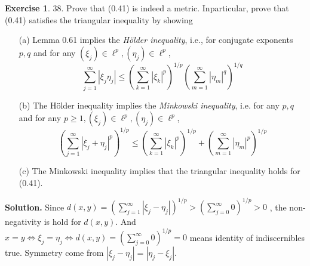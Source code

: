 \documentclass[a4paper]{book}
\newenvironment{solution}%
{\noindent\textbf{Solution.}}%
{\qedhere}
\numberwithin{equation}{chapter}
\theoremstyle{definition}
\newtheorem{exc}[exm]{Exercise}
\begin{document}
\begin{multicols}{2}
\begin{exc}
	38. Prove that (0.41) is indeed a metric. Inparticular, prove that (0.41) satisfies the triangular inequality by showing 
	\begin{itemize}
		\item [(a)] Lemma 0.61 implies the \textit{H\"{o}lder inequality}, i.e., for conjugate exponents $ p,q $ and for any $ (\xi_j) \in \ell^p, (\eta_j) \in \ell^p, $ 
		\begin{equation}\label{1:4:1}
			\sum_{j=1}^{\infty} |\xi_j \eta_j| \leq (\sum_{k=1}^{\infty}|\xi_k|^p)^{1/p} (\sum_{m=1}^{\infty}|\eta_m|^q)^{1/q} 
		\end{equation}
		
		\item[(b)] The H\"{o}lder inequality implies the \textit{Minkowski inequality}, i.e. for any $ p,q $ and for any $ p \geq 1, (\xi_j) \in \ell^p, (\eta_j) \in \ell^p $,
		\begin{equation}\label{1:4:2}
			(\sum_{j=1}^{\infty}|\xi_j + \eta_j|^p)^{1/p} \leq (\sum_{k=1}^{\infty}|\xi_k|^p)^{1/p} + (\sum_{m=1}^{\infty}|\eta_m|^p)^{1/p}
		\end{equation}
		
		\item[(c)] The Minkowski inequality implies that the triangular inequality holds for (0.41).
	\end{itemize}
\end{exc}

\begin{solution}
	Since $d(x,y) =(\sum_{j=1}^{\infty}|\xi_j - \eta_j|)^{1/p} > (\sum_{j = 0}^{\infty} 0)^{1/p} > 0 $ , the non-negativity is hold for $ d(x,y) $. And $ x = y \Longleftrightarrow \xi_j = \eta_j \Longleftrightarrow d(x,y) = (\sum_{j=0}^{\infty} 0 )^{1/p} = 0 $ means identity of indiscernibles true. Symmetry come from $ |\xi_j - \eta_j| = |\eta_j - \xi_j| $.
	

\end{solution}
\end{multicols}
\end{document}

